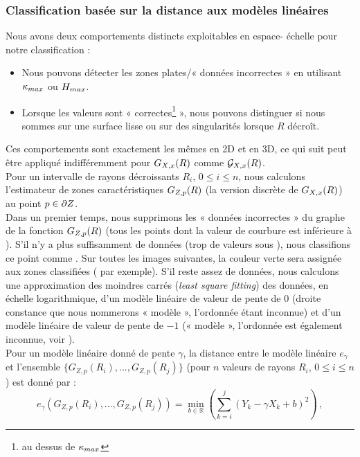 \subsubsection{Classification basée sur la distance aux modèles linéaires}%
\label{sec:applications:feature:II:classification}
%
Nous avons deux comportements distincts exploitables en espace- échelle pour
notre classification :
%
\begin{itemize}
   \item Nous pouvons détecter les zones plates/« données incorrectes » en
         utilisant $\kappa_{max}$ ou $H_{max}$.
   \item Lorsque les valeurs sont « correctes\footnote{\cad au dessus de
         $\kappa_{max}$} », nous pouvons distinguer si nous sommes sur une surface
         lisse ou sur des singularités lorsque $R$ décroît.
\end{itemize}
%
Ces comportements sont exactement les mêmes en 2D et en 3D, ce qui suit peut
être appliqué indifféremment pour $G_{X,x}(R)$ comme $\mathcal{G}_{X,x}(R)$.
%
\\
%
Pour un intervalle de rayons décroissants $R_i$, $0 \leq i \leq n$, nous
calculons l'estimateur de zones caractéristiques $G_{Z,p}(R)$ (la version
discrète de $G_{X,x}(R)$) au point $p \in \partial Z$.
%
\\
%
Dans un premier temps, nous supprimons les « données incorrectes » du graphe de
la fonction $G_{Z,p}(R)$ (\cad tous les points dont la valeur de courbure est
inférieure à \CurvMax). S'il n'y a plus suffisamment de données (trop de valeurs
sous \CurvMax), nous classifions ce point comme \featflat. Sur toutes les images
suivantes, la couleur verte sera assignée aux zones classifiées \featflat
( par exemple). S'il reste assez de
données, nous calculons une approximation des moindres carrés (\emph{least
square fitting}) des données, en échelle logarithmique, d'un modèle linéaire de
valeur de pente de $0$ (droite constance que nous nommerons « modèle \featsmooth »,
l'ordonnée étant inconnue) et d'un modèle linéaire de valeur de pente de $-1$ («
modèle \featedge », l'ordonnée est également inconnue, voir
).
%
\\
%
Pour un modèle linéaire donné de pente $\gamma$, la distance entre le modèle
linéaire $e_\gamma$ et l'ensemble $\{G_{Z,p}(R_i), ..., G_{Z,p}(R_j)\}$ (pour
$n$ valeurs de rayons $R_i$, $0 \leq i \leq n$) est donné par :
%
\begin{equation}
  \label{eq:distance-modele-lineaire}
  e_\gamma(G_{Z,p}(R_i), ..., G_{Z,p}(R_j))= \min_{b\in \mathbb{R}}
  \left ( \sum_{k=i}^j (Y_k - \gamma X_k + b)^2\right)\,,
\end{equation}
